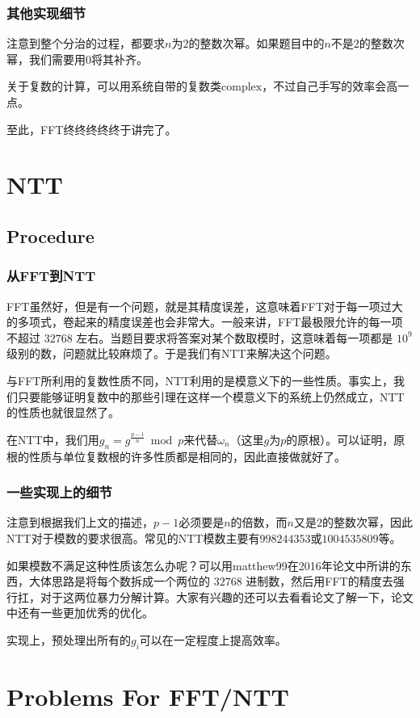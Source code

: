 \documentclass[10pt]{beamer}
\begin{document}
\begin{spacing}{1.2}
		\begin{frame}
			\frametitle{其他实现细节}
			注意到整个分治的过程，都要求$n$为$2$的整数次幂。如果题目中的$n$不是$2$的整数次幂，我们需要用$0$将其补齐。 \pause

			关于复数的计算，可以用系统自带的复数类$\mathrm{complex}$，不过自己手写的效率会高一点。 \pause

			至此，FFT终终终终终于讲完了。
		\end{frame}

		\section{NTT}
		\subsection{Procedure}
		\begin{frame}
			\frametitle{从FFT到NTT}
			FFT虽然好，但是有一个问题，就是其精度误差，这意味着FFT对于每一项过大的多项式，卷起来的精度误差也会非常大。一般来讲，FFT最极限允许的每一项不超过 $32768$ 左右。当题目要求将答案对某个数取模时，这意味着每一项都是 $10^9$ 级别的数，问题就比较麻烦了。于是我们有NTT来解决这个问题。 \pause

			与FFT所利用的复数性质不同，NTT利用的是模意义下的一些性质。事实上，我们只要能够证明复数中的那些引理在这样一个模意义下的系统上仍然成立，NTT的性质也就很显然了。 \pause

			在NTT中，我们用$g_n=g^{\frac{p-1}{n}} \bmod p$来代替$\omega_n$（这里$g$为$p$的原根）。可以证明，原根的性质与单位复数根的许多性质都是相同的，因此直接做就好了。
		\end{frame}

		\begin{frame}
			\frametitle{一些实现上的细节}
			注意到根据我们上文的描述，$p-1$必须要是$n$的倍数，而$n$又是$2$的整数次幂，因此NTT对于模数的要求很高。常见的NTT模数主要有$998244353$或$1004535809$等。 \pause

			如果模数不满足这种性质该怎么办呢？可以用matthew99在2016年论文中所讲的东西，大体思路是将每个数拆成一个两位的 $32768$ 进制数，然后用FFT的精度去强行扛，对于这两位暴力分解计算。大家有兴趣的还可以去看看论文了解一下，论文中还有一些更加优秀的优化。 \pause

			实现上，预处理出所有的$g_i$可以在一定程度上提高效率。
		\end{frame}
		\section{Problems For FFT/NTT}

\end{spacing}
\end{document}
